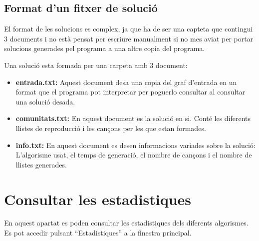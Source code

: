 \documentclass[a4paper,10pt,oneside]{sphinxmanual}
\begin{document}
\section{Format d'un fitxer de solució}
\label{consult_hist:format-d-un-fitxer-de-solucio}
El format de les solucions es complex, ja que ha de ser una capteta que contingui 3 documents i no està pensat per escriure manualment si no mes aviat per portar solucions generades pel programa a una altre copia del programa.

Una solució esta formada per una carpeta amb 3 document:
\begin{itemize}
\item {} 
\textbf{entrada.txt:} Aquest document desa una copia del graf d'entrada en un format que el programa pot interpretar per poguerlo consultar al consultar una solució desada.

\item {} 
\textbf{comunitats.txt:} En aquest document es la solució en si. Conté les diferents llistes de reproducció i les cançons per les que estan formades.

\item {} 
\textbf{info.txt:} En aquest document es desen informacions variades sobre la solució: L'algorisme usat, el temps de generació, el nombre de cançons i el nombre de llistes generades.

\end{itemize}


\chapter{Consultar les estadistiques}
\label{consult_estad:consultar-les-estadistiques}\label{consult_estad::doc}
En aquest apartat es poden consultar les estadistiques dels diferents algorismes. Es pot accedir pulsant ``Estadistiques'' a la finestra principal.
\end{document}
